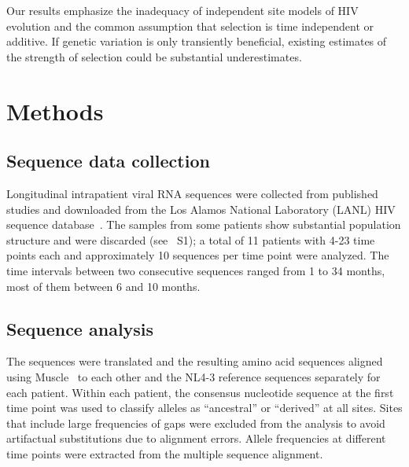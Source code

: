 \documentclass[rmp, twocolumn]{revtex4}
\newcommand{\PCApat}{1}
\begin{document}
Our results emphasize the inadequacy of independent site models of HIV evolution
and the common assumption that selection is time independent or additive. If
genetic variation is only transiently beneficial, existing estimates of the
strength of selection \citep{neher_recombination_2010,batorsky_estimate_2011}
could be substantial underestimates.

\section{Methods}
\subsection{Sequence data collection}
Longitudinal intrapatient viral RNA sequences were collected from published
studies \citep{shankarappa_consistent_1999, liu_selection_2006,
bunnik_autologous_2008} and downloaded from the Los Alamos National Laboratory
(LANL) HIV sequence database~\citep{LANL2012}. The samples from some patients
show substantial population structure and were discarded (see
\figurename~S\PCApat); a total of 11 patients with 4-23 time points each and
approximately 10 sequences per time point were analyzed. The time intervals
between two consecutive sequences ranged from 1 to 34 months, most of them
between 6 and 10 months.

\subsection{Sequence analysis}
The sequences were translated and the resulting amino acid sequences aligned
using Muscle~\citep{edgar_muscle:_2004} to each other and the NL4-3 reference
sequences separately for each patient. Within each patient, the consensus
nucleotide sequence at the first time point was used to classify alleles as
``ancestral'' or ``derived'' at all sites. Sites that include large
frequencies of gaps were excluded from the analysis to avoid artifactual
substitutions due to alignment errors. Allele frequencies at different time
points were extracted from the multiple sequence alignment.
\end{document}
